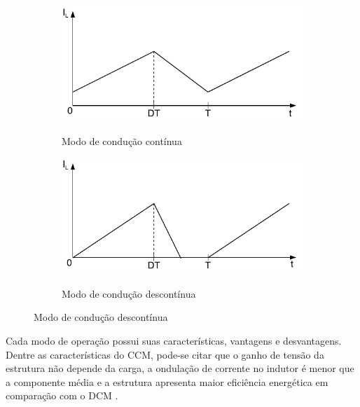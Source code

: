             \begin{figure}[H]
                \centering
                \caption{Corrente no indutor para diferentes modos de operação do conversor}
                \begin{subfigure}[H]{.49\textwidth}
                    \centering
                    \caption{Modo de condução contínua}
                    \includegraphics[scale=.85]{pdf/outros/CCM.pdf}
                    \label{fig:conver_buck_ccm}
                \end{subfigure}
                \begin{subfigure}[H]{.49\textwidth}
                    \centering
                    \caption{Modo de condução descontínua}
                    \includegraphics[scale=.85]{pdf/outros/DCM.pdf}
                    \label{fig:conver_buck_dcm}
                \end{subfigure}
            	\label{fig:conver_buck_ccm_dcm}
            \end{figure}
            
            Cada modo de operação possui suas características, vantagens e desvantagens. Dentre as características do CCM, pode-se citar que o ganho de tensão da estrutura não depende da carga, a ondulação de corrente no indutor é menor que a componente média e a estrutura apresenta maior eficiência energética em comparação com o DCM \cite{ref:ELP_livro_ConversNIsolado}. 
            
